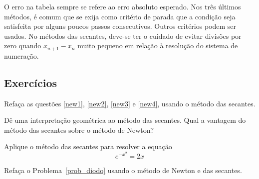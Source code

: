 \begin{obs}
O erro na tabela sempre se refere ao erro absoluto esperado. Nos três últimos métodos, é comum que se exija como critério de parada que a condição seja satisfeita por alguns poucos passos consecutivos. Outros critérios podem ser usados. No métodos das secantes, deve-se ter o cuidado de evitar divisões por zero quando $x_{n+1}-x_n$ muito pequeno em relação à resolução do sistema de numeração.
\end{obs}

\subsection*{Exercícios}

\begin{exer} Refaça as questões \ref{new1}, \ref{new2}, \ref{new3}  e \ref{new4}, usando o método das secantes.
\end{exer}

\begin{exer} Dê uma interpretação geométrica ao método das secantes. Qual a vantagem do método das secantes sobre o método de Newton?
\end{exer}

\begin{exer} Aplique o método das secantes para resolver a equação
  \begin{equation}
    e^{-x^2}=2x
  \end{equation}
\end{exer}

\begin{exer} Refaça o Problema~\ref{prob_diodo} usando o método de Newton e das secantes.
\end{exer}

